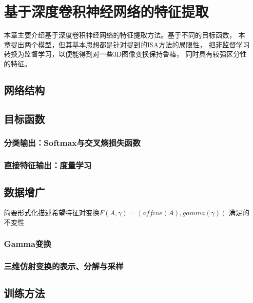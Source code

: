 
\chapter{基于深度卷积神经网络的特征提取}
本章主要介绍基于深度卷积神经网络的特征提取方法。基于不同的目标函数，
本章提出两个模型，但其基本思想都是针对提到的ISA方法的局限性，
把非监督学习转换为监督学习，以便能得到对一些3D图像变换保持鲁棒，
同时具有较强区分性的特征。

\section{网络结构}

\section{目标函数}
\subsection{分类输出：Softmax与交叉熵损失函数}
\subsection{直接特征输出：度量学习}

\section{数据增广}
简要形式化描述希望特征对变换$F(A, \gamma)=(affine(A), gamma(\gamma))$
满足的不变性

\subsection{Gamma变换}

\subsection{三维仿射变换的表示、分解与采样}

\section{训练方法}


